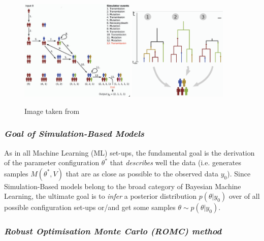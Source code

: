 \documentclass[11pt,twoside]{article}
\numberwithin{Theorem}{section}
\numberwithin{Definition}{section}
\numberwithin{Lemma}{section}
\numberwithin{Algorithm}{section}
\numberwithin{equation}{section}
\begin{document}
\begin{figure}[!ht]
    \begin{center}
      \includegraphics[width=0.49\textwidth]{./images/chapter1/tuber_model_1.png}
      \includegraphics[width=0.42\textwidth]{./images/chapter1/tuber_model_2.png}
    \end{center}
    \caption{Image taken from \cite{Lintusaari2017}}
    \label{fig:tuberculosis_model}
\end{figure}

\subsubsection*{\textit{Goal of Simulation-Based Models}}

As in all Machine Learning (ML) set-ups, the fundamental goal is the derivation of the parameter configuration $\theta^*$ that \textit{describes} well the data (i.e. generates samples $M(\theta^*, V)$ that are as close as possible to the observed data $y_0$). Since Simulation-Based models belong to the broad category of Bayesian Machine Learning, the ultimate goal is to \textit{infer} a posterior distribution $p(\theta|y_0)$ over of all possible configuration set-ups or/and get some samples $\theta \sim p(\theta|y_0)$.

\subsubsection*{\textit{Robust Optimisation Monte Carlo (ROMC) method}}
\end{document}
